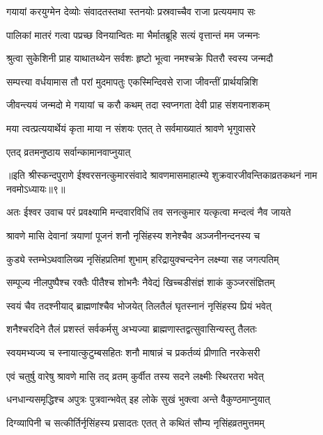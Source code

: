 \twolineshloka
{गयायां करयुग्मेन देव्योः संवादतस्तथा}
{स्तनयोः प्रस्रवाच्चैव राजा प्रत्ययमाप सः} %

\twolineshloka
{पालिकां मातरं गत्वा पप्रच्छ विनयान्वितः}
{मा भैर्मातब्रूहि सत्यं वृत्तान्तं मम जन्मनः} %

\twolineshloka
{श्रुत्वा सुकेशिनी प्राह याथातथ्येन सर्वशः}
{हृष्टो भूत्वा नमश्चक्रे पितरौ स्वस्य जन्मदौ} %

\twolineshloka
{सम्पत्त्या वर्धयामास तौ परां मुदमापतुः}
{एकस्मिन्दिवसे राजा जीवन्तीं प्रार्थयन्निशि} %

\twolineshloka
{जीवन्त्ययं जन्मदो मे गयायां च करौ कथम्}
{तदा स्वप्नगता देवी प्राह संशयनाशकम्} %

\twolineshloka
{मया त्वत्प्रत्ययार्थेयं कृता माया न संशयः}
{एतत् ते सर्वमाख्यातं श्रावणे भृगुवासरे} %

\onelineshloka
{एतद् व्रतमनुष्ठाय सर्वान्कामानवाप्नुयात्} %


{॥इति श्रीस्कन्दपुराणे ईश्वरसनत्कुमारसंवादे श्रावणमासमाहात्म्ये शुक्रवारजीवन्तिकाव्रतकथनं नाम नवमोऽध्यायः॥९॥}




\twolineshloka
{अतः ईश्वर उवाच परं प्रवक्ष्यामि मन्दवारविधिं तव}
{सनत्कुमार यत्कृत्वा मन्दत्वं नैव जायते} %

\twolineshloka
{श्रावणे मासि देवानां त्रयाणां पूजनं शनौ}
{नृसिंहस्य शनेश्चैव अञ्जनीनन्दनस्य च} %

\twolineshloka
{कुड्ये स्तम्भेऽथवालिख्य नृसिंहप्रतिमां शुभाम्}
{हरिद्रायुक्चन्दनेन लक्ष्म्या सह जगत्पतिम्} %

\twolineshloka
{सम्पूज्य नीलपुष्पैश्च रक्तैः पीतैश्च शोभनैः}
{नैवेद्यं खिच्चडीसंज्ञं शाकं कुञ्जरसंज्ञितम्} %

\twolineshloka
{स्वयं चैव तदश्नीयाद् ब्राह्मणांश्चैव भोजयेत्}
{तिलतैलं घृतस्नानं नृसिंहस्य प्रियं भवेत्} %

\twolineshloka
{शनैश्चरदिने तैलं प्रशस्तं सर्वकर्मसु}
{अभ्यज्या ब्राह्मणास्तद्वत्सुवासिन्यस्तु तैलतः} %

\twolineshloka
{स्वयमभ्यज्य च स्नायात्कुटुम्बसहितः शनौ}
{माषान्नं च प्रकर्तव्यं प्रीणाति नरकेसरी} %

\twolineshloka
{एवं चतुर्षु वारेषु श्रावणे मासि तद् व्रतम्}
{कुर्वीत तस्य सदने लक्ष्मीः स्थिरतरा भवेत्} %

\twolineshloka
{धनधान्यसमृद्धिश्च अपुत्रः पुत्रवान्भवेत्}
{इह लोके सुखं भुक्त्वा अन्ते वैकुण्ठमाप्नुयात्} %

\twolineshloka
{दिग्व्यापिनी च सत्कीर्तिर्नृसिंहस्य प्रसादतः}
{एतत् ते कथितं सौम्य नृसिंहव्रतमुत्तमम्} %

